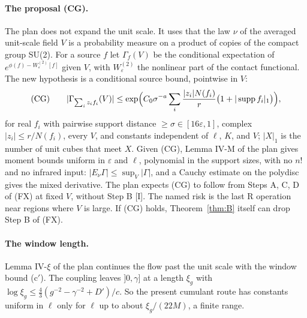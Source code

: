 \paragraph{The proposal (CG).} The plan does not expand the unit scale. It uses that the law $\nu$ of the averaged unit-scale field $V$ is a probability measure on a product of copies of the compact group SU(2). For a source $f$ let $\Gamma_f(V)$ be the conditional expectation of $e^{\phi(f)-W^{(2)}_\varepsilon[f]}$ given $V$, with $W^{(2)}_\varepsilon$ the nonlinear part of the contact functional. The new hypothesis is a conditional source bound, pointwise in $V$:
\[
\text{(CG)}\qquad|\Gamma_{\sum_iz_if_i}(V)|\le\exp\Bigl(C_0\sigma^{-a}\sum_i\frac{|z_i|N(f_i)}{r}\bigl(1+|\operatorname{supp}f_i|_1\bigr)\Bigr),
\]
for real $f_i$ with pairwise support distance $\ge\sigma\in[16\varepsilon,1]$, complex $|z_i|\le r/N(f_i)$, every $V$, and constants independent of $\ell$, $K$, and $V$; $|X|_1$ is the number of unit cubes that meet $X$. Given (CG), Lemma IV-M of the plan gives moment bounds uniform in $\varepsilon$ and $\ell$, polynomial in the support sizes, with no $n!$ and no infrared input: $|E_\nu\Gamma|\le\sup_V|\Gamma|$, and a Cauchy estimate on the polydisc gives the mixed derivative. The plan expects (CG) to follow from Steps A, C, D of (FX) at fixed $V$, without Step B [I]. The named risk is the last R operation near regions where $V$ is large. If (CG) holds, Theorem~\ref{thm:B} itself can drop Step B of (FX).

\paragraph{The window length.} Lemma IV-$\xi$ of the plan continues the flow past the unit scale with the window bound (c$'$). The coupling leaves $]0,\gamma]$ at a length $\xi_g$ with $\log\xi_g\le\frac43(g^{-2}-\gamma^{-2}+D')/c$. So the present cumulant route has constants uniform in $\ell$ only for $\ell$ up to about $\xi_g/(22M)$, a finite range.

